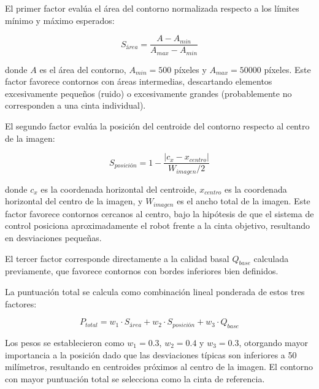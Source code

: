El primer factor evalúa el área del contorno normalizada respecto a los límites mínimo y máximo esperados:

\begin{equation}
S_{área} = \frac{A - A_{min}}{A_{max} - A_{min}}
\end{equation}

donde $A$ es el área del contorno, $A_{min} = 500$ píxeles y $A_{max} = 50000$ píxeles. Este factor favorece contornos con áreas intermedias, descartando elementos excesivamente pequeños (ruido) o excesivamente grandes (probablemente no corresponden a una cinta individual).

El segundo factor evalúa la posición del centroide del contorno respecto al centro de la imagen:

\begin{equation}
S_{posición} = 1 - \frac{|c_x - x_{centro}|}{W_{imagen}/2}
\end{equation}

donde $c_x$ es la coordenada horizontal del centroide, $x_{centro}$ es la coordenada horizontal del centro de la imagen, y $W_{imagen}$ es el ancho total de la imagen. Este factor favorece contornos cercanos al centro, bajo la hipótesis de que el sistema de control posiciona aproximadamente el robot frente a la cinta objetivo, resultando en desviaciones pequeñas.

El tercer factor corresponde directamente a la calidad basal $Q_{base}$ calculada previamente, que favorece contornos con bordes inferiores bien definidos.

La puntuación total se calcula como combinación lineal ponderada de estos tres factores:

\begin{equation}
P_{total} = w_1 \cdot S_{área} + w_2 \cdot S_{posición} + w_3 \cdot Q_{base}
\end{equation}

Los pesos se establecieron como $w_1 = 0.3$, $w_2 = 0.4$ y $w_3 = 0.3$, otorgando mayor importancia a la posición dado que las desviaciones típicas son inferiores a 50 milímetros, resultando en centroides próximos al centro de la imagen. El contorno con mayor puntuación total se selecciona como la cinta de referencia.

